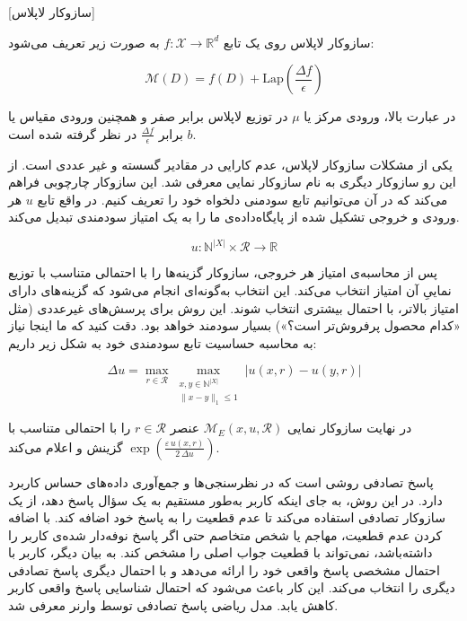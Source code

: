 [سازوکار لاپلاس]

سازوکار لاپلاس روی یک تابع $ f : \mathcal{X} \to \mathbb{R}^d$ به صورت زیر تعریف می‌شود:

\begin{equation}
\mathcal{M}(D) = f(D) + \text{Lap}\left(\frac{\Delta f}{\epsilon}\right)
\end{equation}


در عبارت بالا، ورودی مرکز یا $\mu$ در توزیع لاپلاس برابر صفر و همچنین ورودی مقیاس یا $b$ برابر $\frac{\Delta f}{\epsilon}$ در نظر گرفته شده است.



یکی از مشکلات سازوکار لاپلاس، عدم کارایی در مقادیر گسسته و غیر عددی است. از این رو سازوکار دیگری به نام سازوکار نمایی معرفی شد. این سازوکار چارچوبی فراهم می‌کند که در آن می‌توانیم تابع سودمنی دلخواه خود را تعریف کنیم. در واقع تابع $u$ هر ورودی و خروجی‌ تشکیل شده از پایگاه‌داده‌ی ما را به یک امتیاز سودمندی تبدیل می‌کند.

\begin{equation}
u : \mathbb{N}^{|X|} \times \mathcal{R} \rightarrow \mathbb{R}
\end{equation}

پس از محاسبه‌ی امتیاز هر خروجی، سازوکار گزینه‌ها را با احتمالی متناسب با توزیع نماییِ آن امتیاز انتخاب می‌کند. این انتخاب به‌گونه‌ای انجام می‌شود که گزینه‌های دارای امتیاز بالاتر، با احتمال بیشتری انتخاب شوند. این روش برای پرسش‌های غیرعددی (مثل «کدام محصول پرفروش‌تر است؟») بسیار سودمند خواهد بود. دقت کنید که ما اینجا نیاز به محاسبه حساسیت تابع سودمندی خود به شکل زیر داریم:

\begin{equation}
\Delta u = \max_{r \in \mathcal{R}} \max_{\substack{x,y \in \mathbb{N}^{|X|} \\ \|x - y\|_1 \leq 1}} |u(x,r) - u(y,r)|
\end{equation}

در نهایت سازوکار نمایی $\mathcal{M}_{E}(x,u,\mathcal{R})$ 
عنصر $r \in \mathcal{R}$ را با احتمالی متناسب با
$\exp\!\left(\frac{\varepsilon\,u(x,r)}{2\,\Delta u}\right)$
گزینش و اعلام می‌کند.


پاسخ تصادفی روشی است که در نظرسنجی‌ها و جمع‌آوری داده‌های حساس کاربرد دارد. در این روش، به جای اینکه کاربر به‌طور مستقیم به یک سؤال پاسخ دهد، از یک سازوکار تصادفی استفاده می‌کند تا عدم قطعیت را به پاسخ خود اضافه کند. با اضافه کردن عدم قطعیت، مهاجم یا شخص متخاصم حتی اگر پاسخ نوفه‌دار شده‌ی کاربر را داشته‌باشد، نمی‌تواند با قطعیت جواب اصلی را مشخص کند. به بیان دیگر، کاربر با احتمال مشخصی پاسخ واقعی خود را ارائه می‌دهد و با احتمال دیگری پاسخ تصادفی دیگری را انتخاب می‌کند. این کار باعث می‌شود که احتمال شناسایی پاسخ واقعی کاربر کاهش یابد. مدل ریاضی پاسخ تصادفی توسط وارنر  معرفی شد.

